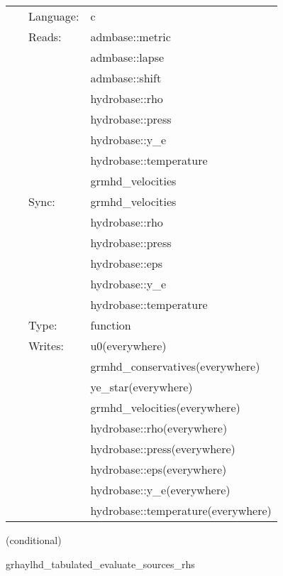 \documentclass{article}
\begin{document}
 \begin{tabular*}{160mm}{cll} 
~ & Language:  & c \\ 
~ & Reads:  & admbase::metric \\ 
~& ~ &admbase::lapse\\ 
~& ~ &admbase::shift\\ 
~& ~ &hydrobase::rho\\ 
~& ~ &hydrobase::press\\ 
~& ~ &hydrobase::y\_e\\ 
~& ~ &hydrobase::temperature\\ 
~& ~ &grmhd\_velocities\\ 
~ & Sync:  & grmhd\_velocities \\ 
~& ~ &hydrobase::rho\\ 
~& ~ &hydrobase::press\\ 
~& ~ &hydrobase::eps\\ 
~& ~ &hydrobase::y\_e\\ 
~& ~ &hydrobase::temperature\\ 
~ & Type:  & function \\ 
~ & Writes:  & u0(everywhere) \\ 
~& ~ &grmhd\_conservatives(everywhere)\\ 
~& ~ &ye\_star(everywhere)\\ 
~& ~ &grmhd\_velocities(everywhere)\\ 
~& ~ &hydrobase::rho(everywhere)\\ 
~& ~ &hydrobase::press(everywhere)\\ 
~& ~ &hydrobase::eps(everywhere)\\ 
~& ~ &hydrobase::y\_e(everywhere)\\ 
~& ~ &hydrobase::temperature(everywhere)\\ 
\end{tabular*} 


\vspace{5mm}

   (conditional) 

\hspace{5mm} grhaylhd\_tabulated\_evaluate\_sources\_rhs 

\hspace{5mm}{\it tabulated version of grhaylhd\_evaluate\_sources\_rhs } 


\hspace{5mm}
\end{document}
